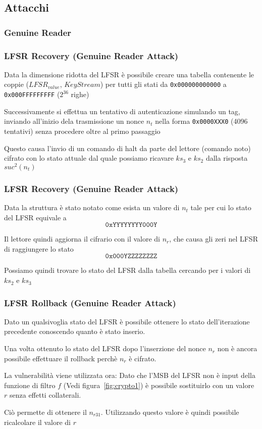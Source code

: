 \subsection{Attacchi}
\subsubsection{Genuine Reader}
\begin{frame}
    \frametitle{LFSR Recovery (Genuine Reader Attack)}
    Data la dimensione ridotta del LFSR è possibile creare una tabella contenente le coppie ($LFSR_{value}$, $KeyStream$) per tutti gli stati da \texttt{0x000000000000} a \texttt{0x000FFFFFFFFF} ($2^{36}$ righe)\pause

    Successivamente si effettua un tentativo di autenticazione simulando un tag, inviando all'inizio dela trasmissione un nonce $n_t$ nella forma \texttt{0x0000XXX0} (4096 tentativi) senza procedere oltre al primo passaggio\pause
    
    Questo causa l'invio di un comando di halt da parte del lettore (comando noto) cifrato con lo stato attuale dal quale possiamo ricavare $ks_3$ e $ks_2$ dalla risposta $suc^2(n_t)$
\end{frame}
\begin{frame}
    \frametitle{LFSR Recovery (Genuine Reader Attack)}
    Data la struttura è stato notato come esista un valore di $n_t$ tale per cui lo stato del LFSR equivale a \[\texttt{0xYYYYYYYY000Y}\]\pause

    Il lettore quindi aggiorna il cifrario con il valore di $n_r$, che causa gli zeri nel LFSR di raggiungere lo stato \[\texttt{0x000YZZZZZZZZ}\]\pause

    Possiamo quindi trovare lo stato del LFSR dalla tabella cercando per i valori di $ks_2$ e $ks_3$
\end{frame}

\begin{frame}
    \frametitle{LFSR Rollback (Genuine Reader Attack)}
    Dato un qualsivoglia stato del LFSR è possibile ottenere lo stato dell'iterazione precedente conoscendo quanto è stato inserio.
    \pause

    Una volta ottenuto lo stato del LFSR dopo l'inserzione del nonce $n_r$ non è ancora possibile effettuare il rollback perchè $n_r$ è cifrato.
    \pause
    
    La vulnerabilità viene utilizzata ora: Dato che l'MSB del LFSR non è input della funzione di filtro $f$ (Vedi figura~\ref{fig:crypto1})
    è possibile sostituirlo con un valore $r$ senza effetti collaterali.
    \pause
    
    Ciò permette di ottenere il $n_{r31}$.
    Utilizzando questo valore è quindi possibile ricalcolare il valore di $r$
\end{frame}

